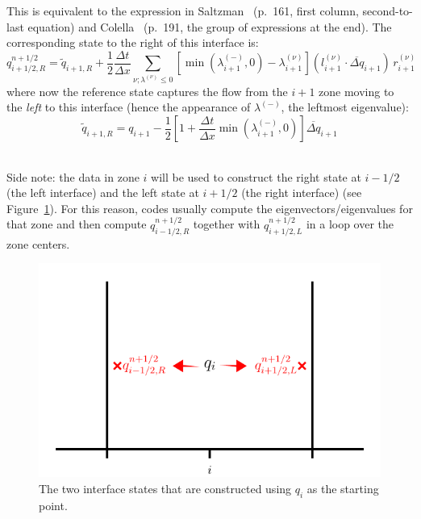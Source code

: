 \documentclass[11pt]{article}
\newcommand{\evm}{{(-)}}
\begin{document}
This is equivalent to the expression in Saltzman~\cite{saltzman:1994}
(p.\ 161, first column, second-to-last equation) and
Colella~\cite{colella:1990} (p.\ 191, the group of expressions at the
end).  The corresponding state to the right of this interface is:
\begin{equation}
q_{i+1/2,R}^{n+1/2} = \tilde{q}_{i+1,R} + \frac{1}{2} \frac{\Delta t}{\Delta x}
       \sum_{\nu; \lambda^{(\nu)} \le 0} 
       \left [ \min(\lambda_{i+1}^\evm,0) - \lambda_{i+1}^{(\nu)} \right ]
       (l_{i+1}^{(\nu)} \cdot \overline{\Delta q}_{i+1}) \, r_{i+1}^{(\nu)}
\end{equation}
where now the reference state captures the flow from the $i+1$ zone
moving to the {\em left} to this interface (hence the appearance of
$\lambda^\evm$, the leftmost eigenvalue):
\begin{equation}
\tilde{q}_{i+1,R} = q_{i+1} - \frac{1}{2} \left [ 1 + \frac{\Delta t}{\Delta x} \min(\lambda_{i+1}^\evm,0) \right ] \overline{\Delta q}_{i+1}
\end{equation}

\ \\

Side note: the data in zone $i$ will be used to construct the right
state at $i-1/2$ (the left interface) and the left state at $i+1/2$
(the right interface) (see Figure~\ref{fig:states}).  For this reason,
codes usually compute the eigenvectors/eigenvalues for that zone and
then compute $q_{i-1/2,R}^{n+1/2}$ together with $q_{i+1/2,L}^{n+1/2}$
in a loop over the zone centers.

\begin{figure}
\centering
\includegraphics[width=5.5in]{states}
\caption{\label{fig:states} The two interface states that are constructed
using $q_i$ as the starting point.}
\end{figure}
\end{document}
